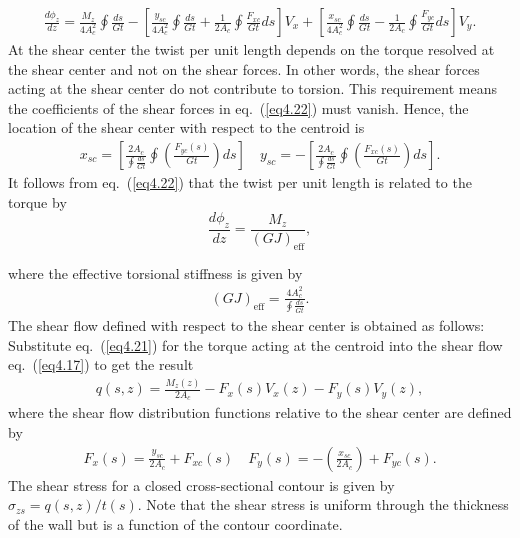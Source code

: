 \documentclass{AeroStructure-ERJohnson}
\begin{document}
\begin{align}\label{eq4.22}
\frac{d \phi_{z}}{d z}=\frac{M_{z}}{4 A_{c}^{2}} \oint\! \frac{d s}{G t}-\left[\frac{y_{s c}}{4 A_{c}^{2}} \oint\! \frac{d s}{G t}+\frac{1}{2 A_{c}} \oint\! \frac{F_{x c}}{G t} d s\right] V_{x}+\left[\frac{x_{s c}}{4 A_{c}^{2}} \oint\! \frac{d s}{G t}-\frac{1}{2 A_{c}} \oint\! \frac{F_{y c}}{G t} d s\right] V_{y}.
\end{align}
At the shear center the twist per unit length depends on the torque resolved at the shear center and not on the shear forces. In other words, the shear forces acting at the shear center do not contribute to torsion. This requirement means the coefficients of the shear forces in eq.~(\ref{eq4.22}) must vanish. Hence, the location of the shear center with respect to the centroid is
\begin{align}\label{eq4.23}
x_{s c}=\left[\frac{2 A_{c}}{\oint\! \frac{d s}{G t}} \oint\left(\frac{F_{y c}(s)}{G t}\right) d s\right] \quad y_{s c}=-\left[\frac{2 A_{c}}{\oint\! \frac{d s}{G t}} \oint\left(\frac{F_{x c}(s)}{G t}\right) d s\right].
\end{align}
It follows from eq.~(\ref{eq4.22}) that the twist per unit length is related to the torque by
\[\frac{d \phi_{z}}{d z}=\frac{M_{z}}{(G J)_{\mathrm{eff}}},\]
\vspace*{3pt}
\clearpage

\noindent where the effective torsional stiffness is given by
\begin{align}\label{eq4.24}
(G J)_{\mathrm{eff}}=\frac{4 A_{c}^{2}}{\oint\! \frac{d s}{G t}}.
\end{align}
The shear flow defined with respect to the shear center is obtained as follows: Substitute eq.~(\ref{eq4.21}) for the torque acting at the centroid into the shear flow eq.~(\ref{eq4.17}) to get the result
\begin{align}\label{eq4.25}
q(s, z)=\frac{M_{z}(z)}{2 A_{c}}-F_{x}(s) V_{x}(z)-F_{y}(s) V_{y}(z),
\end{align}
where the shear flow distribution functions relative to the shear center are defined by
\begin{align}\label{eq4.26}
F_{x}(s)=\frac{y_{s c}}{2 A_{c}}+F_{x c}(s) \quad F_{y}(s)=-\left(\frac{x_{s c}}{2 A_{c}}\right)+F_{y c}(s).
\end{align}
The shear stress for a closed cross-sectional contour is given by $\sigma_{z s}=q(s, z)/t(s)$. Note that the shear stress is uniform through the thickness of the wall but is a function of the contour coordinate.
\end{document}
